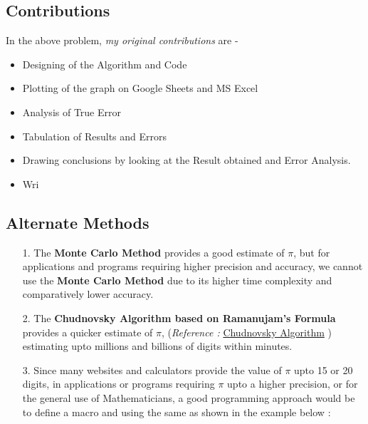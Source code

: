 \documentclass[titlepage, 11pt]{article}
\begin{document}
\inputminted[breaklines,
 mathescape,
 linenos,
 numbersep=5pt,
 frame=single,
 numbersep=5pt,
 xleftmargin=0pt]{c}{A2P1.c}
\label{listing:1}


\subsection{Contributions}
In the above problem, \textit{my original contributions} are - 
\begin{itemize}
    \item Designing of the Algorithm and Code
    \item Plotting of the graph on Google Sheets and MS Excel
    \item Analysis of True Error
    \item Tabulation of Results and Errors
    \item Drawing conclusions by looking at the Result obtained and Error Analysis.
    \item Wri
\end{itemize}


\subsection{Alternate Methods}
\begin{itemize}
    \item [1.]The \textbf{Monte Carlo Method} provides a good estimate of $\pi$, but for applications and programs requiring higher precision and accuracy, we cannot use the \textbf{Monte Carlo Method} due to its higher time complexity and comparatively lower accuracy. 
    \item[2.] The \textbf{Chudnovsky Algorithm based on Ramanujam's Formula} provides a quicker estimate of $\pi$, (\emph{Reference :} \href{https://en.wikipedia.org/wiki/Chudnovsky_algorithm}{Chudnovsky Algorithm} ) estimating upto millions and billions of digits within minutes.
    \item [3.] Since many websites and calculators provide the value of $\pi$ upto 15 or 20 digits, in applications or programs requiring $\pi$ upto a higher precision, or for the general use of Mathematicians, a good programming approach would be to define a macro and using the same as shown in the example below : \\ 
    \begin{center}
    \end{center}
\end{itemize}
\end{document}
